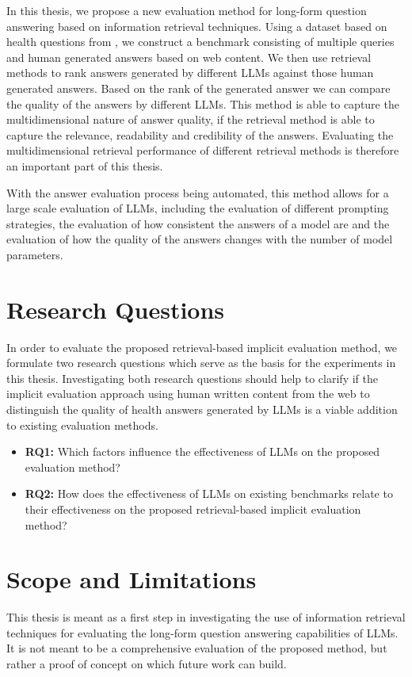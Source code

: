 In this thesis, we propose a new evaluation method for long-form question answering based on information retrieval techniques.
Using a dataset based on health questions from \cite{goeuriot:2021:Consumer}, we construct a benchmark consisting of multiple queries and human generated answers based on web content.
We then use retrieval methods to rank answers generated by different LLMs against those human generated answers.
Based on the rank of the generated answer we can compare the quality of the answers by different LLMs.
This method is able to capture the multidimensional nature of answer quality, if the retrieval method is able to capture the relevance, readability and credibility of the answers.
Evaluating the multidimensional retrieval performance of different retrieval methods is therefore an important part of this thesis.

With the answer evaluation process being automated, this method allows for a large scale evaluation of LLMs, including the evaluation of different prompting strategies, the evaluation of how consistent the answers of a model are and the evaluation of how the quality of the answers changes with the number of model parameters.


\section{Research Questions}\label{sec:research-question}
In order to evaluate the proposed retrieval-based implicit evaluation method, we formulate two research questions which serve as the basis for the experiments in this thesis.
Investigating both research questions should help to clarify if the implicit evaluation approach using human written content from the web to distinguish the quality of health answers generated by LLMs is a viable addition to existing evaluation methods.

\begin{itemize}
    \item \textbf{RQ1:} Which factors influence the effectiveness of LLMs on the proposed evaluation method?
    \item \textbf{RQ2:} How does the effectiveness of LLMs on existing benchmarks relate to their effectiveness on the proposed retrieval-based implicit evaluation method?%
\end{itemize}


\section{Scope and Limitations}\label{sec:scope-and-limitations}
This thesis is meant as a first step in investigating the use of information retrieval techniques for evaluating the long-form question answering capabilities of LLMs.
It is not meant to be a comprehensive evaluation of the proposed method, but rather a proof of concept on which future work can build.

